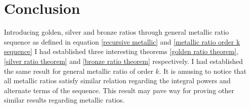 \documentclass{rmutt-seminar}
\begin{document}
\section{Conclusion}

Introducing golden, silver and bronze ratios through general metallic ratio sequence as defined in equation \eqref{recursive metallic} and \eqref{metallic ratio order k sequence} 
I had established three interesting theorems \ref{golden ratio theorem}, \ref{silver ratio theorem} and \ref{bronze ratio theorem} respectively. I had 	
established the same result for general metallic ratio of order $k$. It is amusing to notice that all metallic ratios 
satisfy similar relation regarding the integral powers and alternate terms of the sequence. This result may pave 
way for proving other similar results regarding metallic ratios.


\printbibliography

	
\end{document}
